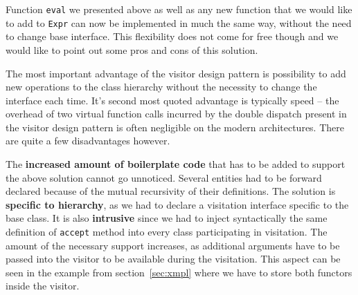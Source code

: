 \documentclass[preprint]{sigplanconf}
\makeatletter
\DeclareRobustCommand{\code}[1]{{\lstinline[breaklines=false,escapechar=@]{#1}}}
\makeatother
\begin{document}
Function \code{eval} we presented above as well as any new function that we 
would like to add to \code{Expr} can now be implemented in much the same way, 
without the need to change base interface. This flexibility does not come for 
free though and we would like to point out some pros and cons of this solution.

The most important advantage of the visitor design pattern is possibility to add 
new operations to the class hierarchy without the necessity to change the 
interface each time. It's second most quoted advantage is typically speed -- the 
overhead of two virtual function calls incurred by the double dispatch present 
in the visitor design pattern is often negligible on the modern architectures. 
There are quite a few disadvantages however.

The {\bf increased amount of boilerplate code} that has to be added to support 
the above solution cannot go unnoticed. Several entities had to be forward 
declared because of the mutual recursivity of their definitions. The solution is 
{\bf specific to hierarchy}, as we had to declare a visitation interface 
specific to the base class. It is also {\bf intrusive} since we had to inject 
syntactically the same definition of \code{accept} method into every class 
participating in visitation. The amount of the necessary support increases, as 
additional arguments have to be passed into the visitor to be available during 
the visitation. This aspect can be seen in the example from 
section~\ref{sec:xmpl} where we have to store both functors inside the visitor.  
\end{document}
